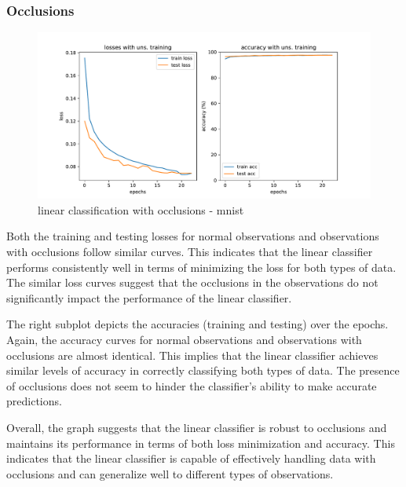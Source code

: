 \documentclass{midl} %
\begin{document}
\subsubsection{Occlusions}
\begin{figure}[H]
  \centering
  \includegraphics[width=1.2\textwidth]{linear_classif_occ_mnist.pdf}
  \caption{linear classification with occlusions - mnist}
  \label{fig: linear classification with occlusions - mnist}
\end{figure}
Both the training and testing losses for normal observations and observations with occlusions follow similar curves. This indicates that the linear classifier performs consistently well in terms of minimizing the loss for both types of data. The similar loss curves suggest that the occlusions in the observations do not significantly impact the performance of the linear classifier.

The right subplot depicts the accuracies (training and testing) over the epochs. Again, the accuracy curves for normal observations and observations with occlusions are almost identical. This implies that the linear classifier achieves similar levels of accuracy in correctly classifying both types of data. The presence of occlusions does not seem to hinder the classifier's ability to make accurate predictions.

Overall, the graph suggests that the linear classifier is robust to occlusions and maintains its performance in terms of both loss minimization and accuracy. This indicates that the linear classifier is capable of effectively handling data with occlusions and can generalize well to different types of observations.
\end{document}
